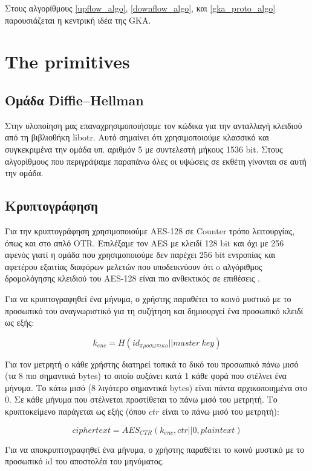 Στους αλγορίθμους \ref{upflow_algo}, \ref{downflow_algo}, και \ref{gka_proto_algo} παρουσιάζεται η κεντρική ιδέα της GKA.


\section{The primitives}

\subsection{Ομάδα Diffie--Hellman}

Στην υλοποίηση μας επαναχρησιμοποιήσαμε τον κώδικα για την ανταλλαγή κλειδιού \dhname από τη βιβλιοθήκη libotr.
Αυτό σημαίνει ότι χρησιμοποιούμε κλασσικό \dhname και συγκεκριμένα την ομάδα υπ. αριθμόν 5 με συντελεστή μήκους 1536 bit.
Στους αλγορίθμους που περιγράψαμε παραπάνω όλες οι υψώσεις σε εκθέτη γίνονται σε αυτή την ομάδα.

\subsection{Κρυπτογράφηση}

Για την κρυπτογράφηση χρησιμοποιούμε AES-128 σε Counter τρόπο λειτουργίας, όπως και στο απλό OTR.
Επιλέξαμε τον AES με κλειδί 128 bit και όχι με 256 αφενός γιατί η ομάδα \dhname που χρησιμοποιούμε δεν παρέχει 256 bit εντροπίας και αφετέρου εξαιτίας διαφόρων μελετών που υποδεικνύουν ότι o αλγόριθμος δρομολόγησης κλειδιού του AES-128 είναι πιο ανθεκτικός σε επιθέσεις \cite{aes-key-recov} \cite{rijndael-improved-analysis}.

Για να κρυπτογραφηθεί ένα μήνυμα, ο χρήστης παραθέτει το κοινό μυστικό με το προσωπικό του αναγνωριστικό για τη συζήτηση και δημιουργεί ένα προσωπικό κλειδί ως εξής:

\[
k_{enc} = H(id_{προσωπικο} || master\ key)
\]

Για τον μετρητή ο κάθε χρήστης διατηρεί τοπικά το δικό του προσωπικό πάνω μισό (τα 8 πιο σημαντικά bytes) το οποίο αυξάνει κατά 1 κάθε φορά που στέλνει ένα μήνυμα.
Το κάτω μισό (8 λιγότερο σημαντικά bytes) είναι πάντα αρχικοποιημένα στο 0.
Σε κάθε μήνυμα που στέλνεται προστίθεται το πάνω μισό του μετρητή.
Το κρυπτοκείμενο παράγεται ως εξής (όπου $ctr$ είναι το πάνω μισό του μετρητή):

\[
ciphertext = AES_{CTR}(k_{enc}, ctr||0, plaintext)
\]

Για να αποκρυπτογραφηθεί ένα μήνυμα, ο χρήστης παραθέτει το κοινό μυστικό με το προσωπικό id του αποστολέα του μηνύματος.

